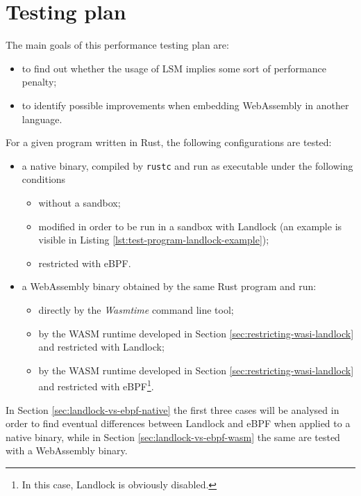 \section{Testing plan}

The main goals of this performance testing plan are:
\begin{itemize}
  \item to find out whether the usage of LSM implies some sort of performance penalty;
  \item to identify possible improvements when embedding WebAssembly in another language.
\end{itemize}

\noindent
For a given program written in Rust, the following configurations are tested:
\begin{itemize}
  \item a native binary, compiled by \texttt{rustc} and run as executable under the following conditions
        \begin{itemize}
          \item without a sandbox;
          \item modified in order to be run in a sandbox with Landlock (an example is visible in Listing \ref{lst:test-program-landlock-example});
          \item restricted with eBPF.
        \end{itemize}
  \item a WebAssembly binary obtained by the same Rust program and run:
        \begin{itemize}
          \item directly by the \textit{Wasmtime} command line tool;
          \item by the WASM runtime developed in Section \ref{sec:restricting-wasi-landlock} and restricted with Landlock;
          \item by the WASM runtime developed in Section \ref{sec:restricting-wasi-landlock} and restricted with
                eBPF\footnote{In this case, Landlock is obviously disabled.}.
        \end{itemize}
\end{itemize}

In Section \ref{sec:landlock-vs-ebpf-native} the first three cases will be analysed in order to find
eventual differences between Landlock and eBPF when applied to a native binary, while in Section
\ref{sec:landlock-vs-ebpf-wasm} the same are tested with a WebAssembly binary.

